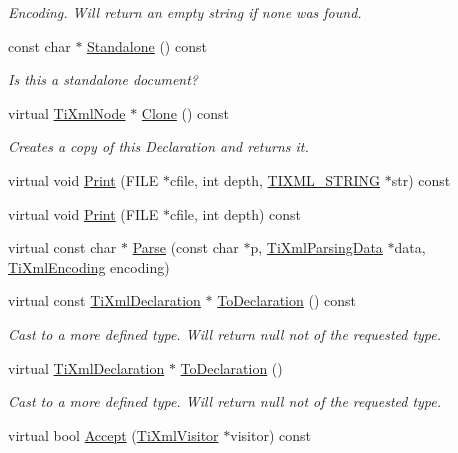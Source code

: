 \begin{DoxyCompactItemize}
\begin{DoxyCompactList}\small\item\em Encoding. Will return an empty string if none was found. \end{DoxyCompactList}\item 
const char $\ast$ \hyperlink{class_ti_xml_declaration_a9ff06afc033d7ef730ec7c6825b97ad9}{Standalone} () const 
\begin{DoxyCompactList}\small\item\em Is this a standalone document? \end{DoxyCompactList}\item 
virtual \hyperlink{class_ti_xml_node}{Ti\-Xml\-Node} $\ast$ \hyperlink{class_ti_xml_declaration_aff8231266d735943d8a7514a9c9822b9}{Clone} () const 
\begin{DoxyCompactList}\small\item\em Creates a copy of this Declaration and returns it. \end{DoxyCompactList}\item 
virtual void \hyperlink{class_ti_xml_declaration_aa5ab32ec19d4eeecff4a9238c6c90565}{Print} (F\-I\-L\-E $\ast$cfile, int depth, \hyperlink{tinyxml_8h_a92bada05fd84d9a0c9a5bbe53de26887}{T\-I\-X\-M\-L\-\_\-\-S\-T\-R\-I\-N\-G} $\ast$str) const 
\item 
virtual void \hyperlink{class_ti_xml_declaration_abf6303db4bd05b5be554036817ff1cb4}{Print} (F\-I\-L\-E $\ast$cfile, int depth) const 
\item 
virtual const char $\ast$ \hyperlink{class_ti_xml_declaration_a9839ea97ed687a2b7342fd7b0f04361b}{Parse} (const char $\ast$p, \hyperlink{class_ti_xml_parsing_data}{Ti\-Xml\-Parsing\-Data} $\ast$data, \hyperlink{tinyxml_8h_a88d51847a13ee0f4b4d320d03d2c4d96}{Ti\-Xml\-Encoding} encoding)
\item 
virtual const \hyperlink{class_ti_xml_declaration}{Ti\-Xml\-Declaration} $\ast$ \hyperlink{class_ti_xml_declaration_a1e085d3fefd1dbf5ccdbff729931a967}{To\-Declaration} () const 
\begin{DoxyCompactList}\small\item\em Cast to a more defined type. Will return null not of the requested type. \end{DoxyCompactList}\item 
virtual \hyperlink{class_ti_xml_declaration}{Ti\-Xml\-Declaration} $\ast$ \hyperlink{class_ti_xml_declaration_a6bd3d1daddcaeb9543c24bfd090969ce}{To\-Declaration} ()
\begin{DoxyCompactList}\small\item\em Cast to a more defined type. Will return null not of the requested type. \end{DoxyCompactList}\item 
virtual bool \hyperlink{class_ti_xml_declaration_ab6a6b178161ba9abc2c35058de689864}{Accept} (\hyperlink{class_ti_xml_visitor}{Ti\-Xml\-Visitor} $\ast$visitor) const 
\end{DoxyCompactItemize}
